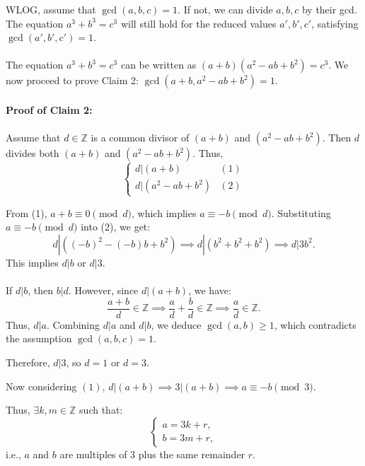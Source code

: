 \documentclass{article}
\begin{document}

WLOG, assume that $\gcd(a, b, c) = 1$. If not, we can divide \(a, b, c\) by their gcd. The equation \(a^3 + b^3 = c^3\) will still hold for the reduced values \(a', b', c'\), satisfying \(\gcd(a', b', c') = 1\).\\\\

The equation \(a^3 + b^3 = c^3\) can be written as \((a + b)(a^2 - ab + b^2) = c^3\). We now proceed to prove Claim 2: \(\gcd(a + b, a^2 - ab + b^2) = 1\).\\\\

\textbf{Proof of Claim 2:}\\\\
Assume that \(d \in \mathbb{Z}\) is a common divisor of \((a + b)\) and \((a^2 - ab + b^2)\). Then \(d\) divides both \((a + b)\) and \((a^2 - ab + b^2)\). Thus, 
\[
\begin{cases}
d | (a + b) & (1) \\
d | (a^2 - ab + b^2) & (2)
\end{cases}
\]

From (1), \(a + b \equiv 0 \pmod{d}\), which implies \(a \equiv -b \pmod{d}\). Substituting \(a \equiv -b \pmod{d}\) into (2), we get:
\[
d | ((-b)^2 - (-b)b + b^2) \implies d | (b^2 + b^2 + b^2) \implies d | 3b^2.
\]
This implies \(d | b\) or \(d | 3\).\\\\
If \(d | b\), then \(b | d\). However, since \(d | (a+b)\), we have:
\[
\frac{a + b}{d} \in \mathbb{Z} \implies \frac{a}{d} + \frac{b}{d} \in \mathbb{Z} \implies \frac{a}{d} \in \mathbb{Z}.
\]
Thus, \(d | a\). Combining \(d | a\) and \(d | b\), we deduce \(\gcd(a, b) \geq 1\), which contradicts the assumption \(\gcd(a, b, c) = 1\).

Therefore, \(d | 3\), so \(d = 1\) or \(d = 3\).

Now considering \((1)\), \(d | (a + b) \implies 3 | (a + b) \implies a \equiv -b \pmod{3}\). 

Thus, \(\exists k, m \in \mathbb{Z}\) such that:
\[
\begin{cases}
a = 3k + r, \\
b = 3m + r,
\end{cases}
\]
i.e., \(a\) and \(b\) are multiples of 3 plus the same remainder \(r\).
\end{document}
